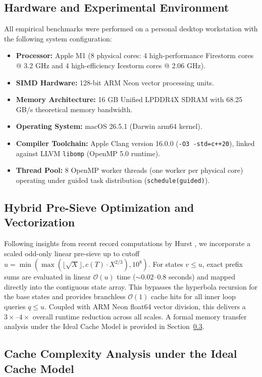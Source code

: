 \documentclass[11pt,a4paper]{article}
\theoremstyle{plain}
\theoremstyle{definition}
\newcommand{\Oh}{\mathcal{O}}
\begin{document}
\subsection{Hardware and Experimental Environment}
All empirical benchmarks were performed on a personal desktop workstation with the following system configuration:
\begin{itemize}
    \item \textbf{Processor:} Apple M1 (8 physical cores: 4 high-performance Firestorm cores @ 3.2 GHz and 4 high-efficiency Icestorm cores @ 2.06 GHz).
    \item \textbf{SIMD Hardware:} 128-bit ARM Neon vector processing units.
    \item \textbf{Memory Architecture:} 16 GB Unified LPDDR4X SDRAM with 68.25 GB/s theoretical memory bandwidth.
    \item \textbf{Operating System:} macOS 26.5.1 (Darwin arm64 kernel).
    \item \textbf{Compiler Toolchain:} Apple Clang version 16.0.0 (\texttt{-O3 -std=c++20}), linked against LLVM \texttt{libomp} (OpenMP 5.0 runtime).
    \item \textbf{Thread Pool:} 8 OpenMP worker threads (one worker per physical core) operating under guided task distribution (\texttt{schedule(guided)}).
\end{itemize}

\subsection{Hybrid Pre-Sieve Optimization and Vectorization}
Following insights from recent record computations by Hurst \cite{hurst2026practical}, we incorporate a scaled odd-only linear pre-sieve up to cutoff $u = \min(\max(\lfloor\sqrt{X}\rfloor, c(T) \cdot X^{2/3}), 10^8)$. For states $v \le u$, exact prefix sums are evaluated in linear $\Oh(u)$ time ($\sim 0.02$--$0.8$ seconds) and mapped directly into the contiguous state array. This bypasses the hyperbola recursion for the base states and provides branchless $\Oh(1)$ cache hits for all inner loop queries $q \le u$. Coupled with ARM Neon float64 vector division, this delivers a $3\times$--$4\times$ overall runtime reduction across all scales. A formal memory transfer analysis under the Ideal Cache Model is provided in Section~\ref{sec:cache}.

\subsection{Cache Complexity Analysis under the Ideal Cache Model}
\label{sec:cache}
\end{document}
